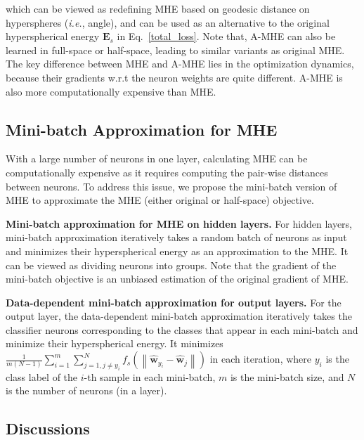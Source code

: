\par which can be viewed as redefining MHE based on geodesic distance on hyperspheres (\emph{i.e.}, angle), and can be used as an alternative to the original hyperspherical energy $\bm{E}_s$ in Eq.~\eqref{total_loss}. Note that, A-MHE can also be learned in full-space or half-space, leading to similar variants as original MHE. The key difference between MHE and A-MHE lies in the optimization dynamics, because their gradients w.r.t the neuron weights are quite different. A-MHE is also more computationally expensive than MHE.

\subsection{Mini-batch Approximation for MHE} 

With a large number of neurons in one layer, calculating MHE can be computationally expensive as it requires computing the pair-wise distances between neurons. To address this issue, we propose the mini-batch version of MHE to approximate the MHE (either original or half-space) objective.
\par

\textbf{Mini-batch approximation for MHE on hidden layers.} For hidden layers, mini-batch approximation iteratively takes a random batch of neurons as input and minimizes their hyperspherical energy as an approximation to the MHE. It can be viewed as dividing neurons into groups. Note that the gradient of the mini-batch objective is an unbiased estimation of the original gradient of MHE.
\par

\textbf{Data-dependent mini-batch approximation for output layers.} For the output layer, the data-dependent mini-batch approximation iteratively takes the classifier neurons corresponding to the classes that appear in each mini-batch and minimize their hyperspherical energy. It minimizes $\frac{1}{m(N-1)}\sum_{i=1}^{m}\sum_{j=1,j\neq y_i}^{N} f_s(\left\lVert\hat{\bm{w}}_{y_i}-\hat{\bm{w}}_j\right\rVert)$ in each iteration, where $y_i$ is the class label of the $i$-th sample in each mini-batch, $m$ is the mini-batch size, and $N$ is the number of neurons (in a layer).

\subsection{Discussions}\label{discussions}

